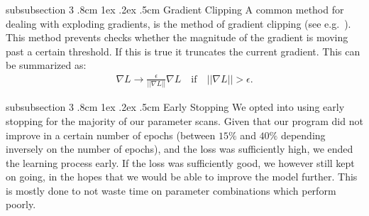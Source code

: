 \documentclass[%
reprint,
amsmath,amssymb,
aps,
]{revtex4-2}
\makeatletter
\renewcommand{\subsubsection}{%
	\@startsection
	{subsubsection}%
	{3}%
	{\z@}%
	{.8cm \@plus1ex \@minus .2ex}%
	{.5cm}%
	{\normalfont\small\centering}%
}
\makeatother
\begin{document}
\subsubsection{Gradient Clipping}
A common method for dealing with exploding gradients, is the method of gradient clipping (see e.g.~\cite{Goodfellow-et-al-2016}). This method prevents checks whether the magnitude of the gradient is moving past a certain threshold. If this is true it truncates the current gradient. This can be summarized as:
\begin{align}	\label{eq:clipping}
	\nabla L \rightarrow \frac{\epsilon}{||\nabla L||}\nabla L\quad\text{if}\quad||\nabla L|| > \epsilon.
\end{align}

\subsubsection{Early Stopping}
We opted into using early stopping for the majority of our parameter scans. Given that our program did not improve in a certain number of epochs (between $15\%$ and $40\%$ depending inversely on the number of epochs), and the loss was sufficiently high, we ended the learning process early. If the loss was sufficiently good, we however still kept on going, in the hopes that we would be able to improve the model further. This is mostly done to not waste time on parameter combinations which perform poorly. 
\end{document}
